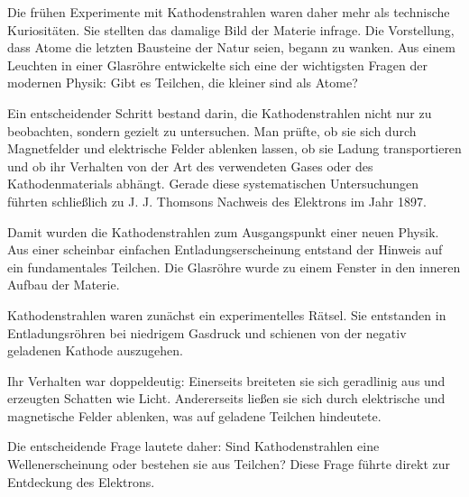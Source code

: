 Die frühen Experimente mit Kathodenstrahlen waren daher mehr als technische
Kuriositäten. Sie stellten das damalige Bild der Materie infrage. Die Vorstellung,
dass Atome die letzten Bausteine der Natur seien, begann zu wanken. Aus einem
Leuchten in einer Glasröhre entwickelte sich eine der wichtigsten Fragen der modernen
Physik: Gibt es Teilchen, die kleiner sind als Atome?

Ein entscheidender Schritt bestand darin, die Kathodenstrahlen nicht nur zu beobachten,
sondern gezielt zu untersuchen. Man prüfte, ob sie sich durch Magnetfelder
und elektrische Felder ablenken lassen, ob sie Ladung
transportieren und ob ihr Verhalten von der Art des verwendeten Gases oder des
Kathodenmaterials abhängt. Gerade diese systematischen Untersuchungen führten
schließlich zu J. J. Thomsons Nachweis des Elektrons im Jahr 1897.

Damit wurden die Kathodenstrahlen zum Ausgangspunkt einer neuen Physik. Aus einer
scheinbar einfachen Entladungserscheinung entstand der Hinweis auf ein fundamentales
Teilchen. Die Glasröhre wurde zu einem Fenster in den inneren Aufbau der Materie.

\begin{HistoryBox}
	\label{box:kathodenstrahl}
	Kathodenstrahlen waren zunächst ein experimentelles Rätsel. Sie entstanden in
	Entladungsröhren bei niedrigem Gasdruck und schienen von der negativ geladenen
	Kathode auszugehen.
	
	Ihr Verhalten war doppeldeutig: Einerseits breiteten sie sich geradlinig aus und
	erzeugten Schatten wie Licht. Andererseits ließen sie sich durch elektrische und
	magnetische Felder ablenken, was auf geladene Teilchen hindeutete.
	
	Die entscheidende Frage lautete daher: Sind Kathodenstrahlen eine Wellenerscheinung
	oder bestehen sie aus Teilchen? Diese Frage führte direkt zur Entdeckung des
	Elektrons.
\end{HistoryBox}